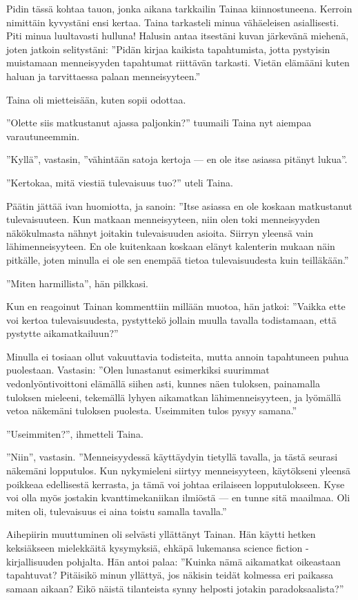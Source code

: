 ﻿\documentclass[a4paper, 12pt, finnish]{article}
\newcommand{\q}[1]{''#1''}
\begin{document}
Pidin tässä kohtaa
tauon, jonka aikana tarkkailin Tainaa kiinnostuneena.
Kerroin nimittäin kyvystäni ensi kertaa. Taina tarkasteli
minua vähäeleisen asiallisesti. Piti minua luultavasti hulluna!
Halusin antaa itsestäni kuvan järkevänä miehenä, joten
jatkoin selitystäni: \q{Pidän kirjaa kaikista tapahtumista,
jotta pystyisin muistamaan menneisyyden tapahtumat riittävän
tarkasti. Vietän elämääni kuten haluan ja tarvittaessa
palaan menneisyyteen.}

Taina oli mietteisään, kuten sopii odottaa.

\q{Olette siis matkustanut ajassa paljonkin?} tuumaili Taina nyt
aiempaa varautuneemmin.

\q{Kyllä}, vastasin, \q{vähintään satoja kertoja --- en ole
itse asiassa pitänyt lukua}.

\q{Kertokaa, mitä viestiä tulevaisuus tuo?} uteli Taina.

Päätin jättää ivan huomiotta, ja sanoin:
\q{Itse asiassa en ole koskaan matkustanut
tulevaisuuteen. Kun matkaan menneisyyteen, niin
olen toki menneisyyden näkökulmasta nähnyt joitakin
tulevaisuuden asioita. Siirryn yleensä vain
lähimenneisyyteen. En ole kuitenkaan koskaan elänyt
kalenterin mukaan näin pitkälle, joten minulla
ei ole sen enempää tietoa tulevaisuudesta kuin teilläkään.}

\q{Miten harmillista}, hän pilkkasi.

Kun en reagoinut Tainan kommenttiin millään muotoa, hän jatkoi:
\q{Vaikka ette voi kertoa tulevaisuudesta, pystyttekö jollain muulla
tavalla todistamaan, että pystytte aikamatkailuun?}

Minulla ei tosiaan ollut vakuuttavia todisteita, mutta annoin tapahtuneen
puhua puolestaan. Vastasin: \q{Olen lunastanut esimerkiksi
suurimmat vedonlyöntivoittoni elämällä siihen asti,
kunnes näen tuloksen, painamalla tuloksen mieleeni,
tekemällä lyhyen aikamatkan lähimenneisyyteen,
ja lyömällä vetoa näkemäni tuloksen puolesta. Useimmiten tulos pysyy samana.}

\q{Useimmiten?}, ihmetteli Taina.

\q{Niin}, vastasin. \q{Menneisyydessä käyttäydyin tietyllä tavalla,
ja tästä seurasi näkemäni lopputulos. Kun nykymieleni siirtyy
menneisyyteen, käytökseni yleensä poikkeaa edellisestä kerrasta,
ja tämä voi johtaa erilaiseen lopputulokseen. Kyse voi olla myös
jostakin kvanttimekaniikan ilmiöstä --- en tunne sitä maailmaa.
Oli miten oli, tulevaisuus ei aina toistu samalla tavalla.}

Aihepiirin muuttuminen oli selvästi yllättänyt Tainan.
Hän käytti hetken keksiäkseen mielekkäitä kysymyksiä, ehkäpä
lukemansa science fiction -kirjallisuuden pohjalta. Hän antoi palaa: 
\q{Kuinka nämä aikamatkat oikeastaan tapahtuvat? Pitäisikö minun yllättyä, jos
näkisin teidät kolmessa eri paikassa samaan aikaan? Eikö näistä
tilanteista synny helposti jotakin paradoksaalista?}
\end{document}
